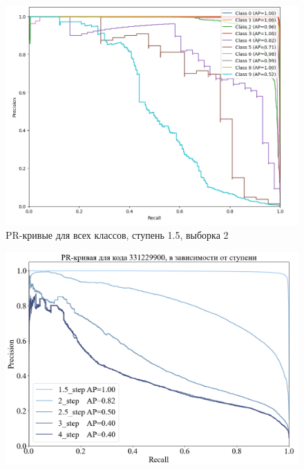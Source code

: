 \documentclass{article}
\begin{document}
\begin{figure}[!ht]
        \centering
        \includegraphics[width=\linewidth]{pr_good.png}
        \caption{PR-кривые для всех классов, ступень 1.5, выборка 2}
        \label{fig:pr2}
\end{figure}
\begin{figure}[!ht]
        \centering
        \includegraphics[width=\linewidth]{pr_curve_1.png}
        \label{fig:pr3}
\end{figure}
\end{document}
